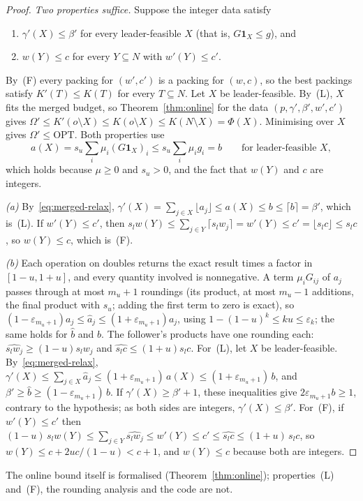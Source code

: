 \begin{proof}
\emph{Two properties suffice.} Suppose the integer data satisfy
\begin{enumerate}
\item[(L)] $\gamma'(X)\le\beta'$ for every leader-feasible $X$ (that is,
$G\mathbf{1}_X\le g$), and
\item[(F)] $w(Y)\le c$ for every $Y\subseteq N$ with $w'(Y)\le c'$.
\end{enumerate}
By~(F) every packing for $(w',c')$ is a packing for $(w,c)$, so the best
packings satisfy $K'(T)\le K(T)$ for every $T\subseteq N$. Let $X$ be
leader-feasible. By~(L), $X$ fits the merged budget, so
Theorem~\ref{thm:online} for the data $(p,\gamma',\beta',w',c')$ gives
$\Omega'\le K'(o\setminus X)\le K(o\setminus X)\le K(N\setminus X)=\Phi(X)$.
Minimising over $X$ gives $\Omega'\le\mathrm{OPT}$. Both properties use
\begin{equation}\label{eq:merged-relax}
  a(X)=s_u\sum_i\mu_i(G\mathbf{1}_X)_i\le s_u\sum_i\mu_ig_i=b\qquad\text{for leader-feasible }X,
\end{equation}
which holds because $\mu\ge 0$ and $s_u>0$, and the fact that $w(Y)$ and $c$
are integers.

\emph{(a)} By~\eqref{eq:merged-relax},
$\gamma'(X)=\sum_{j\in X}\lfloor a_j\rfloor\le a(X)\le b\le\lceil b\rceil=\beta'$,
which is~(L). If $w'(Y)\le c'$, then
$s_lw(Y)\le\sum_{j\in Y}\lceil s_lw_j\rceil=w'(Y)\le c'=\lfloor s_lc\rfloor\le s_lc$,
so $w(Y)\le c$, which is~(F).

\emph{(b)} Each operation on doubles returns the exact result times a factor
in $[1-u,1+u]$, and every quantity involved is nonnegative. A term
$\mu_iG_{ij}$ of $a_j$ passes through at most $m_u+1$ roundings (its product,
at most $m_u-1$ additions, the final product with $s_u$; adding the first
term to zero is exact), so
$(1-\varepsilon_{m_u+1})a_j\le\hat a_j\le(1+\varepsilon_{m_u+1})a_j$, using
$1-(1-u)^k\le ku\le\varepsilon_k$; the same holds for $\hat b$ and $b$. The
follower's products have one rounding each:
$\widehat{s_lw_j}\ge(1-u)s_lw_j$ and $\widehat{s_lc}\le(1+u)s_lc$.
For~(L), let $X$ be leader-feasible. By~\eqref{eq:merged-relax},
$\gamma'(X)\le\sum_{j\in X}\hat a_j\le(1+\varepsilon_{m_u+1})\,a(X)\le(1+\varepsilon_{m_u+1})\,b$,
and $\beta'\ge\hat b\ge(1-\varepsilon_{m_u+1})\,b$. If $\gamma'(X)\ge\beta'+1$,
these inequalities give $2\varepsilon_{m_u+1}b\ge 1$, contrary to the
hypothesis; as both sides are integers, $\gamma'(X)\le\beta'$. For~(F), if
$w'(Y)\le c'$ then
$(1-u)\,s_lw(Y)\le\sum_{j\in Y}\widehat{s_lw_j}\le w'(Y)\le c'\le\widehat{s_lc}\le(1+u)\,s_lc$,
so $w(Y)\le c+2uc/(1-u)<c+1$, and $w(Y)\le c$ because both are integers.
\end{proof}
\noindent The online bound itself is formalised (Theorem~\ref{thm:online});
properties~(L) and~(F), the rounding analysis and the code are not.

